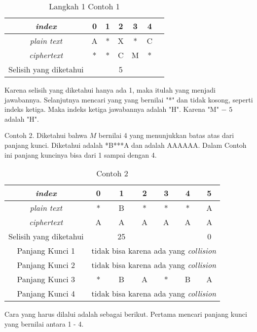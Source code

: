 	\begin{table}[H]
	 	\centering
		\caption{Langkah 1 Contoh 1}	 	
	 	\setlength{\arrayrulewidth}{.08em}
	 	\begin{tabular}{|c|c|c|c|c|c|c|}\hline
	 	\textit{index}&0&1&2&3&4\\ \hline
	 	\textit{plain text}&\cellcolor{blue!15}A&\cellcolor{lime!15}*&\cellcolor{yellow!25}X&\cellcolor{green!15}*&\cellcolor{pink!25}C\\ \hline
	 	\textit{ciphertext}&\cellcolor{blue!15}*&\cellcolor{lime!15}*&\cellcolor{yellow!25}C&\cellcolor{green!15}M&\cellcolor{pink!25}*\\ \hline
	 	Selisih yang diketahui& & &5& & \\ \hline
	 	\end{tabular}
	 	\label{tab:langkah1contoh1}
	\end{table}
	
	  Karena selisih yang diketahui hanya ada 1, maka itulah yang menjadi jawabannya. Selanjutnya mencari yang \plaintext yang bernilai "*" dan \ciphertext tidak kosong, seperti indeks ketiga. Maka indeks ketiga jawabannya adalah "H". Karena "M" $-$ $5$ adalah "H".
	 
	 
	 
	 Contoh 2. Diketahui bahwa $M$ bernilai 4 yang menunjukkan batas atas dari panjang kunci. Diketahui \plaintext adalah *B***A dan \ciphertext adalah AAAAAA. Dalam Contoh ini panjang kuncinya bisa dari 1 sampai dengan 4. 
	 \begin{table}[H]
	 	\centering
	 	\caption{Contoh 2}
	 	\begin{tabular}{|c|c|c|c|c|c|c|}\hline
		\textit{index}&0&1&2&3&4&5\\ \hline
	 	\textit{plain text}&*&B&*&*&*&A\\ \hline
	 	\textit{ciphertext}&A&A&A&A&A&A\\ \hline
	 	Selisih yang diketahui& &25& & & &0\\ \hline
	 	Panjang Kunci 1 & \multicolumn{6}{c|}{tidak bisa karena ada yang \textit{collision}}\\ \hline
	 	Panjang Kunci 2 & \multicolumn{6}{c|}{tidak bisa karena ada yang \textit{collision}}\\ \hline
	 	Panjang Kunci 3 &*&B&A&*&B&A \\ \hline
	 	Panjang Kunci 4 & \multicolumn{6}{c|}{tidak bisa karena ada yang \textit{collision}}\\ \hline
	 	\end{tabular}
	 	\label{tab:contoh2}
	\end{table}
	Cara yang harus dilalui adalah sebagai berikut. Pertama mencari panjang kunci yang bernilai antara 1 - 4. \\
	
